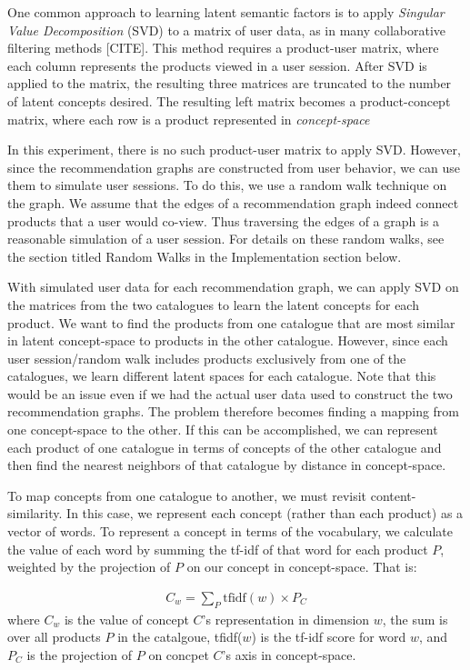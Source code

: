 \documentclass[11pt]{article}
\begin{document}
One common approach to learning latent semantic factors is to apply {\em
Singular Value Decomposition} (SVD) to a matrix of user data, as in many 
collaborative filtering methods [CITE]. This method requires a product-user
matrix, where each column represents the products viewed in a user session.
After SVD is applied to the matrix, the resulting three matrices are truncated
to the number of latent concepts desired. The resulting left matrix becomes a
product-concept matrix, where each row is a product represented in 
{\em concept-space}

In this experiment, there is no such product-user matrix to apply SVD.
However, since the recommendation graphs are constructed from user behavior,
we can use them to simulate user sessions. To do this, we use a random walk 
technique on the graph. We assume that the edges of a recommendation graph 
indeed connect products that a user would co-view. Thus traversing the edges 
of a graph is a reasonable simulation of a user session. For details on these
random walks, see the section titled Random Walks in the Implementation section
below.

With simulated user data for each recommendation graph, we can apply SVD on the
matrices from the two catalogues to learn the latent concepts for each product.
We want to find the products from one catalogue that are most similar in latent
concept-space to products in the other catalogue. However, since each user
session/random walk includes products exclusively from one of the catalogues, we
learn different latent spaces for each catalogue. Note that this would be an
issue even if we had the actual user data used to construct the two
recommendation graphs. The problem therefore becomes finding a mapping from one
concept-space to the other. If this can be accomplished, we can represent each
product of one catalogue in terms of concepts of the other catalogue and then
find the nearest neighbors of that catalogue by distance in concept-space. 

To map concepts from one catalogue to another, we must revisit
content-similarity. In this case, we represent each concept (rather than each
product) as a vector of words. To represent a concept in terms of the
vocabulary, we calculate the value of each word by summing the
tf-idf of that word for each product $P$, weighted by the projection of $P$ on
our concept in concept-space. That is:

\begin{align}
C_w = \sum\limits_{P} \text{tfidf}(w)\times P_C
\end{align}
where $C_w$ is the value of concept $C$'s representation in dimension $w$, the
sum is over all products $P$ in the catalgoue, tfidf($w$) is the tf-idf score
for word $w$, and $P_C$ is the projection of $P$ on concpet $C$'s axis in
concept-space.
\end{document}
